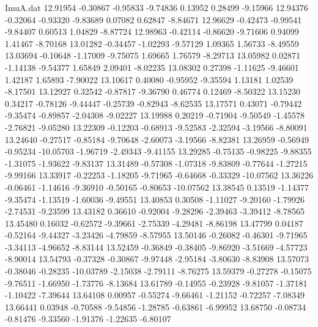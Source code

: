 \begin{filecontents}{ImuA.dat}
  12.91954   -0.30867   -0.95833   -9.74836    0.13952    0.28499   -9.15966
  12.94376   -0.32064   -0.93320   -9.83689    0.07082    0.62847   -8.84671
  12.96629   -0.42473   -0.99541   -9.84407    0.60513    1.04829   -8.87724
  12.98963   -0.42114   -0.86620   -9.71606    0.94099    1.41467   -8.70168
  13.01282   -0.34457   -1.02293   -9.57129    1.09365    1.56733   -8.49559
  13.03694   -0.10648   -1.17009   -9.75075    1.69665    1.76579   -8.29713
  13.05982    0.02871   -1.14138   -9.54377    1.65849    2.09401   -8.02235
  13.08302    0.27398   -1.11625   -9.46601    1.42187    1.65893   -7.90022
  13.10617    0.40080   -0.95952   -9.35594    1.13181    1.02539   -8.17501
  13.12927    0.32542   -0.87817   -9.36790    0.46774    0.12469   -8.50322
  13.15230    0.34217   -0.78126   -9.44447   -0.25739   -0.82943   -8.62535
  13.17571    0.43071   -0.79442   -9.35474   -0.89857   -2.04308   -9.02227
  13.19988    0.20219   -0.71904   -9.50549   -1.45578   -2.76821   -9.05280
  13.22309   -0.12203   -0.68913   -9.52583   -2.32594   -3.19566   -8.80091
  13.24640   -0.27517   -0.85184   -9.70648   -2.60073   -3.19566   -8.82381
  13.26959   -0.56949   -0.95234  -10.05703   -1.96719   -2.49343   -9.41155
  13.29285   -0.75135   -0.98225   -9.88355   -1.31075   -1.93622   -9.83137
  13.31489   -0.57308   -1.07318   -9.83809   -0.77644   -1.27215   -9.99166
  13.33917   -0.22253   -1.18205   -9.71965   -0.64668   -0.33329  -10.07562
  13.36226   -0.06461   -1.14616   -9.36910   -0.50165   -0.80653  -10.07562
  13.38545    0.13519   -1.14377   -9.35474   -1.13519   -1.60036   -9.49551
  13.40853    0.30508   -1.11027   -9.20160   -1.79926   -2.74531   -9.23599
  13.43182    0.36610   -0.92004   -9.28296   -2.39463   -3.39412   -8.78565
  13.45480    0.16032   -0.62572   -9.39661   -2.75339   -4.29481   -8.86198
  13.47799    0.04187   -0.52164   -9.44327   -3.23426   -4.79859   -8.57955
  13.50146   -0.26082   -0.46301   -9.71965   -3.34113   -4.96652   -8.83144
  13.52459   -0.36849   -0.38405   -9.86920   -3.51669   -4.57723   -8.90014
  13.54793   -0.37328   -0.30867   -9.97448   -2.95184   -3.80630   -8.83908
  13.57073   -0.38046   -0.28235  -10.03789   -2.15038   -2.79111   -8.76275
  13.59379   -0.27278   -0.15075   -9.76511   -1.66950   -1.73776   -8.13684
  13.61789   -0.14955   -0.23928   -9.81057   -1.37181   -1.10422   -7.39644
  13.64108    0.00957   -0.55274   -9.66461   -1.21152   -0.72257   -7.08349
  13.66441    0.03948   -0.70588   -9.54856   -1.28785   -0.63861   -6.99952
  13.68750   -0.08734   -0.81476   -9.33560   -1.91376   -1.22635   -6.80107

\end{filecontents}

